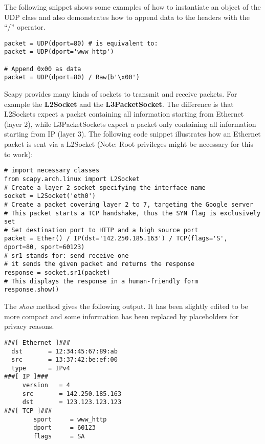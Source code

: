 The following snippet shows some examples of how to instantiate an object of the UDP class and also demonstrates how to append data to the headers with the “/” operator.

\begin{samepage}
\begin{verbatim}
packet = UDP(dport=80) # is equivalent to:
packet = UDP(dport='www_http')

# Append 0x00 as data
packet = UDP(dport=80) / Raw(b'\x00')
\end{verbatim}
\end{samepage}

Scapy provides many kinds of sockets to transmit and receive packets. For example the \textbf{L2Socket} and the \textbf{L3PacketSocket}. The difference is that L2Sockets expect a packet containing all information starting from Ethernet (layer 2), while L3PacketSockets expect a packet only containing all information starting from IP (layer 3). The following code snippet illustrates how an Ethernet packet is sent via a L2Socket (Note: Root privileges might be necessary for this to work):

\begin{samepage}
\begin{verbatim}
# import necessary classes
from scapy.arch.linux import L2Socket
# Create a layer 2 socket specifying the interface name
socket = L2Socket('eth0')
# Create a packet covering layer 2 to 7, targeting the Google server
# This packet starts a TCP handshake, thus the SYN flag is exclusively set
# Set destination port to HTTP and a high source port
packet = Ether() / IP(dst='142.250.185.163') / TCP(flags='S', dport=80, sport=60123)
# sr1 stands for: send receive one
# it sends the given packet and returns the response
response = socket.sr1(packet)
# This displays the response in a human-friendly form
response.show()
\end{verbatim}
\end{samepage}

The \emph{show} method gives the following output. It has been slightly edited to be more compact and some information has been replaced by placeholders for privacy reasons.

\begin{samepage}
\begin{verbatim}
###[ Ethernet ]### 
  dst       = 12:34:45:67:89:ab
  src       = 13:37:42:be:ef:00
  type      = IPv4
###[ IP ]### 
     version   = 4
     src       = 142.250.185.163
     dst       = 123.123.123.123
###[ TCP ]### 
        sport     = www_http
        dport     = 60123
        flags     = SA
\end{verbatim}
\end{samepage}

